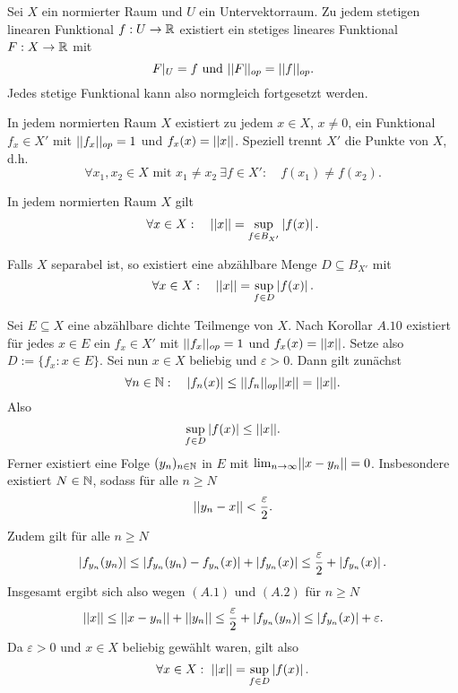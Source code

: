 \begin{theorem}
    Sei $X$ ein normierter Raum und $U$ ein Untervektorraum. 
    Zu jedem stetigen linearen Funktional $f:U \to \mathbb{R}$ existiert ein stetiges lineares Funktional $F:X \to \mathbb{R}$ mit 
    $$
        F|_U = f \text{ und } \lvert\lvert F \rvert\rvert_{op} = \lvert\lvert f \rvert\rvert_{op}.
    $$
    Jedes stetige Funktional kann also normgleich fortgesetzt werden.
\end{theorem}

\begin{corollary}
    In jedem normierten Raum $X$ existiert zu jedem $x \in X$, $x \neq 0$, ein Funktional $f_x \in X'$ mit $\lvert\lvert f_x \rvert\rvert_{op} = 1$ und $f_x(x) = \lvert\lvert x \rvert\rvert$. 
    Speziell trennt $X'$  die Punkte von $X$, d.h.
    $$
        \forall x_1, x_2 \in X \text{ mit } x_1 \neq x_2 \ \exists f \in X': \quad f(x_1) \neq f(x_2). 
    $$
\end{corollary}

\begin{corollary}
    In jedem normierten Raum $X$ gilt 
    $$
        \forall x \in X : \quad \lvert\lvert x \rvert\rvert = \sup_{f \in B_{X'}}\left| f(x) \right|.
    $$
\end{corollary}

\begin{corollary}
    Falls $X$ separabel ist, so existiert eine abzählbare Menge $D \subseteq B_{X'}$ mit 
    $$
        \forall x \in X : \quad \lvert\lvert x \rvert\rvert = \sup_{f \in D}\left| f(x) \right|. 
    $$
\end{corollary}

\begin{proof*}
    Sei $E \subseteq X$ eine abzählbare dichte Teilmenge von $X$. Nach Korollar $A.10$ existiert für jedes $x \in E$ ein $f_x \in X'$ mit 
    $\lvert\lvert f_x \rvert\rvert_{op} = 1$ und $f_x(x) = \lvert\lvert x \rvert\rvert$. Setze also $D:=\{f_x : x \in E\}$. Sei nun $x \in X$ beliebig und $\varepsilon > 0$. Dann gilt zunächst 
    $$
        \forall n \in \mathbb{N}: \quad \left| f_n(x) \right| \leq \lvert\lvert f_n \rvert\rvert_{op} \lvert\lvert x \rvert\rvert = \lvert\lvert x \rvert\rvert. 
    $$
    Also
    $$
        \sup_{f \in D}\left| f(x) \right| \leq \lvert\lvert x \rvert\rvert. 
    $$
    Ferner existiert eine Folge $(y_n)_{n \in \mathbb{N}}$ in $E$ mit $\lim_{n \to \infty}\lvert\lvert x-y_n \rvert\rvert = 0$. Insbesondere existiert $N \in \mathbb{N}$, sodass für alle $n \geq N$ 
    \begin{align}
        \lvert\lvert y_n - x \rvert\rvert < \frac{\varepsilon}{2}.
    \end{align}
    Zudem gilt für alle $n \geq N$
    \begin{align}
        \left| f_{y_n}(y_n) \right| \leq \left| f_{y_n}(y_n)-f_{y_n}(x) \right| + \left| f_{y_n}(x) \right| \leq \frac{\varepsilon}{2} + \left| f_{y_n}(x) \right|.
    \end{align}
    Insgesamt ergibt sich also wegen $(A.1)$ und $(A.2)$ für $n \geq N$
    $$
        \lvert\lvert x \rvert\rvert \leq \lvert\lvert x - y_n \rvert\rvert + \lvert\lvert y_n \rvert\rvert \leq \frac{\varepsilon}{2} + \left| f_{y_n}(y_n) \right| \leq \left| f_{y_n}(x) \right| + \varepsilon. 
    $$
    Da $\varepsilon > 0$ und $x \in X$ beliebig gewählt waren, gilt also 
    $$
        \forall x \in X: \ \lvert\lvert x \rvert\rvert = \sup_{f \in D}\left| f(x) \right|.  
    $$
\end{proof*}

